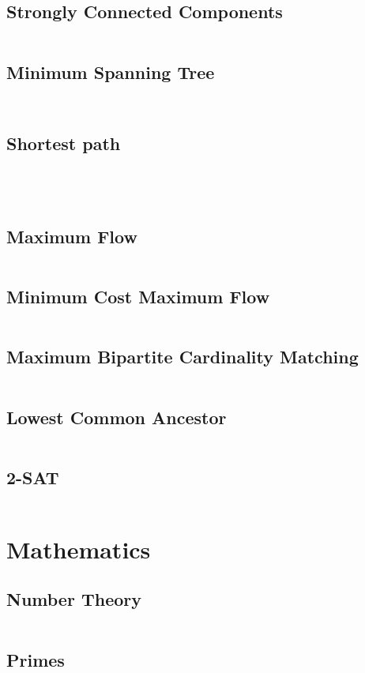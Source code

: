 \documentclass[a4paper, 10pt, twocolumn, landscape]{article}
\begin{document}
  \subsection{Strongly Connected Components}
  \inputminted{cpp}{graphs/kosaraju.cpp}
  \subsection{Minimum Spanning Tree}
  \inputminted{cpp}{graphs/kruskal.cpp}
  \inputminted{cpp}{graphs/prim.cpp}
  \subsection{Shortest path}
  \inputminted{cpp}{graphs/dijkstra.cpp}
  \inputminted{cpp}{graphs/bellman-ford.cpp}
  \inputminted{cpp}{graphs/spfa.cpp}
  \inputminted{cpp}{graphs/floyd-warshall.cpp}
  \subsection{Maximum Flow}
  \inputminted{cpp}{graphs/dinic.cpp} %
  \subsection{Minimum Cost Maximum Flow}
  \inputminted{cpp}{graphs/min-cost-max-flow.cpp} %
  \subsection{Maximum Bipartite Cardinality Matching}
  \inputminted{cpp}{graphs/kuhn.cpp}
  \subsection{Lowest Common Ancestor}
  \inputminted{cpp}{graphs/lca.cpp}
  \subsection{2-SAT}
  \inputminted{cpp}{graphs/2-sat.cpp}

  \section{Mathematics}
  \subsection{Number Theory}
  \inputminted{cpp}{math/basics.cpp}
  \subsection{Primes}
  \inputminted{cpp}{math/sieve.cpp}
\end{document}
